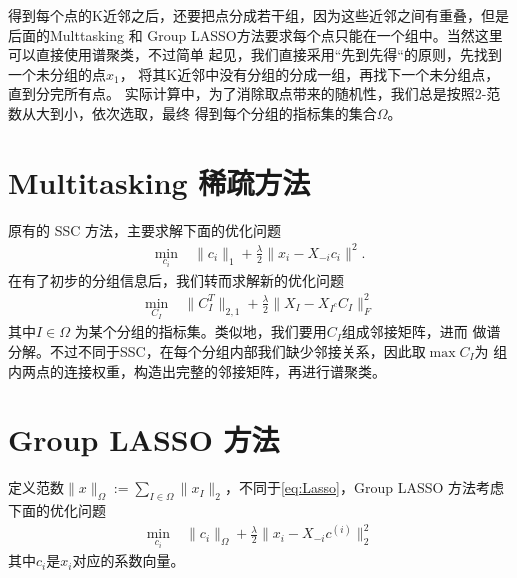 \documentclass[main]{subfiles}
\begin{document}
得到每个点的K近邻之后，还要把点分成若干组，因为这些近邻之间有重叠，但是后面的Multtasking
和 Group LASSO方法要求每个点只能在一个组中。当然这里可以直接使用谱聚类，不过简单
起见，我们直接采用“先到先得“的原则，先找到一个未分组的点$x_1$，
将其K近邻中没有分组的分成一组，再找下一个未分组点，直到分完所有点。
实际计算中，为了消除取点带来的随机性，我们总是按照2-范数从大到小，依次选取，最终
得到每个分组的指标集的集合$\Omega$。

\section{Multitasking 稀疏方法}
原有的 SSC 方法，主要求解下面的优化问题
\begin{align}\label{eq:Lasso}
  \min_{c_i} \; &\|c_i\|_1+\frac{\lambda}{2}\|x_i-X_{-i}c_i\|^2.
\end{align}
在有了初步的分组信息后，我们转而求解新的优化问题
\begin{align} \label{eq:Multi}
  \min_{C_I}\; & \|C_I^T\|_{2, 1} + \frac{\lambda}{2} \|X_I - X_{I^c}C_I\|_F^2
\end{align}
其中$I\in \Omega$ 为某个分组的指标集。类似地，我们要用$C_I$组成邻接矩阵，进而
做谱分解。不过不同于SSC，在每个分组内部我们缺少邻接关系，因此取$\max C_I$为
组内两点的连接权重，构造出完整的邻接矩阵，再进行谱聚类。

\section{Group LASSO 方法}
定义范数$\|x\|_{\Omega}:=\sum_{I\in \Omega} \|x_I\|_2$，不同于\ref{eq:Lasso}，Group LASSO 方法考虑下面的优化问题
\begin{align}
  \min_{c_i} \; & \|c_i\|_{\Omega} + \frac{\lambda}{2} \|x_i - X_{-i}
  c^{(i)}\|_2^2
  \label{eq:group}
\end{align}
其中$c_i$是$x_i$对应的系数向量。
\end{document}
